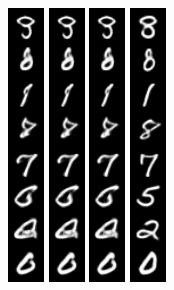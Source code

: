 \begin{figure}[]
{\includegraphics[width=0.06\columnwidth]{figures/MNIST_evolution/train_image_50.png}
\includegraphics[width=0.06\columnwidth]{figures/MNIST_evolution/train_image_100.png}
\includegraphics[width=0.06\columnwidth]{figures/MNIST_evolution/train_image_200.png}
\hspace{0.1cm}
\includegraphics[width=0.06\columnwidth]{figures/MNIST_evolution/train_image_match_200.png}
}
\end{figure}
